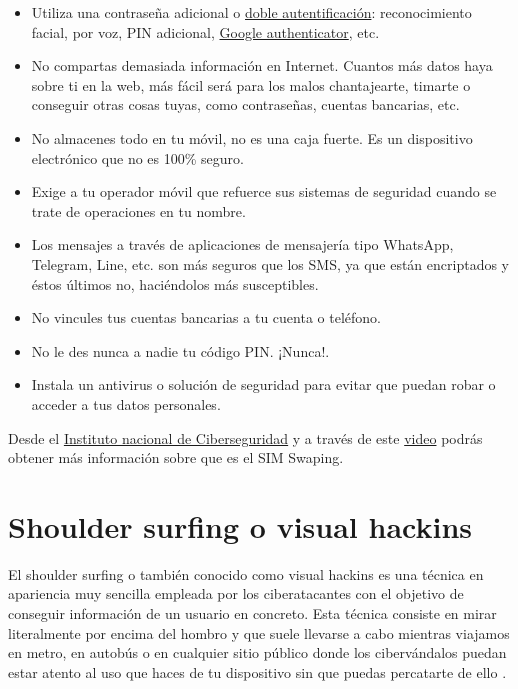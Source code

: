 \documentclass[
  spanish,
  a4paper,
  openany]{book}
\begin{document}
\begin{itemize}
\item
  Utiliza una contraseña adicional o \href{https://www.osi.es/es/actualidad/blog/2019/02/27/el-factor-de-autenticacion-doble-y-multiple}{doble autentificación}: reconocimiento facial, por voz, PIN adicional, \href{https://play.google.com/store/apps/details?id=com.google.android.apps.authenticator2\&hl=es\&gl=US}{Google authenticator}, etc.
\item
  No compartas demasiada información en Internet. Cuantos más datos haya sobre ti en la web, más fácil será para los malos chantajearte, timarte o conseguir otras cosas tuyas, como contraseñas, cuentas bancarias, etc.
\item
  No almacenes todo en tu móvil, no es una caja fuerte. Es un dispositivo electrónico que no es 100\% seguro.
\item
  Exige a tu operador móvil que refuerce sus sistemas de seguridad cuando se trate de operaciones en tu nombre.
\item
  Los mensajes a través de aplicaciones de mensajería tipo WhatsApp, Telegram, Line, etc. son más seguros que los SMS, ya que están encriptados y éstos últimos no, haciéndolos más susceptibles.
\item
  No vincules tus cuentas bancarias a tu cuenta o teléfono.
\item
  No le des nunca a nadie tu código PIN. ¡Nunca!.
\item
  Instala un antivirus o solución de seguridad para evitar que puedan robar o acceder a tus datos personales.
\end{itemize}

Desde el \href{https://www.incibe.es/}{Instituto nacional de Ciberseguridad} y a través de este \href{https://www.youtube.com/watch?v=fIaodow_nxw}{video} podrás obtener más información sobre que es el SIM Swaping.

\hypertarget{shoulder-surfing-o-visual-hackins}{%
\section{Shoulder surfing o visual hackins}\label{shoulder-surfing-o-visual-hackins}}

El shoulder surfing o también conocido como visual hackins es una técnica en apariencia muy sencilla empleada por los ciberatacantes con el objetivo de conseguir información de un usuario en concreto. Esta técnica consiste en mirar literalmente por encima del hombro y que suele llevarse a cabo mientras viajamos en metro, en autobús o en cualquier sitio público donde los cibervándalos puedan estar atento al uso que haces de tu dispositivo sin que puedas percatarte de ello \citep{OSI-shoulder-surfing}.
\end{document}
